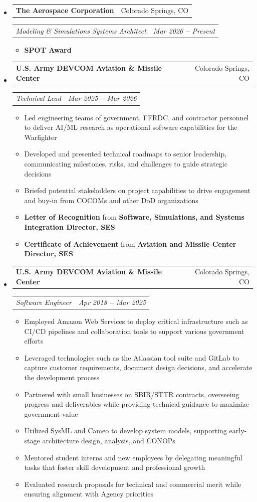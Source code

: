 \documentclass[letterpaper,11pt]{article}
\makeatletter
\newenvironment{entries}
  {\begin{itemize}[leftmargin=0.15in, label={}, topsep=0pt, parsep=0pt, itemsep=0pt]}
  {\end{itemize}}
\newenvironment{bullets}
  {\vspace{-10pt}\begin{itemize}[topsep=0pt, partopsep=0pt]\small}
  {\end{itemize}}
\newcommand{\heading}[2]{
  \vspace{4pt}\item
    \begin{tabular*}{0.97\textwidth}[t]{l@{\extracolsep{\fill}}r}
      \textbf{#1} & \small#2 \\
    \end{tabular*}
}
\newcommand{\subtitle}[2]{
    \vspace{2pt}
    \begin{tabular*}{0.97\textwidth}[t]{l@{\extracolsep{\fill}}r}
      \textit{\small#1} & \textit{\small #2} \\
    \end{tabular*}
}
\makeatother
\begin{document}
\begin{entries}

  \heading{The Aerospace Corporation}{Colorado Springs, CO}
  \subtitle{Modeling \& Simulations Systems Architect}{Mar 2026 \textbf{--} Present}
  \begin{bullets}
    \item[] \textbf{SPOT Award}
  \end{bullets}

  \heading{U.S. Army DEVCOM Aviation \& Missile Center}{Colorado Springs, CO}
  \subtitle{Technical Lead}{Mar 2025 \textbf{--} Mar 2026}
  \begin{bullets}
    \item Led engineering teams of government, FFRDC, and contractor personnel to deliver AI/ML research as operational software capabilities for the Warfighter
    \item Developed and presented technical roadmaps to senior leadership, communicating milestones, risks, and challenges to guide strategic decisions
    \item Briefed potential stakeholders on project capabilities to drive engagement and buy-in from COCOMs and other DoD organizations
    \item[] \textbf{Letter of Recognition} from \textbf{Software, Simulations, and Systems Integration Director, SES}
    \item[] \textbf{Certificate of Achievement} from \textbf{Aviation and Missile Center Director, SES}
  \end{bullets}

  \heading{U.S. Army DEVCOM Aviation \& Missile Center}{Colorado Springs, CO}
  \subtitle{Software Engineer}{Apr 2018 \textbf{--} Mar 2025}
  \begin{bullets}
    \item Employed Amazon Web Services to deploy critical infrastructure such as CI/CD pipelines and collaboration tools to support various government efforts
    \item Leveraged technologies such as the Atlassian tool suite and GitLab to capture customer requirements, document design decisions, and accelerate the development process
    \item Partnered with small businesses on SBIR/STTR contracts, overseeing progress and deliverables while providing technical guidance to maximize government value
    \item Utilized SysML and Cameo to develop system models, supporting early-stage architecture design, analysis, and CONOPs
    \item Mentored student interns and new employees by delegating meaningful tasks that foster skill development and professional growth
    \item Evaluated research proposals for technical and commercial merit while ensuring alignment with Agency priorities
  \end{bullets}

\end{entries}
\end{document}

